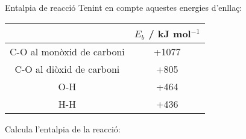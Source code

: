 \begin{exr}{Entalpia de reacció}
Tenint en compte aquestes energies d'enllaç:

\begin{tabular}{cc}
& $E_b$ / kJ mol$^{-1}$ \\
\hline
C-O al monòxid de carboni & +1077 \\
C-O al diòxid de carboni & +805 \\
O-H & +464 \\
H-H & +436 \\
\hline
\end{tabular}

Calcula l'entalpia de la reacció:
\end{exr}
